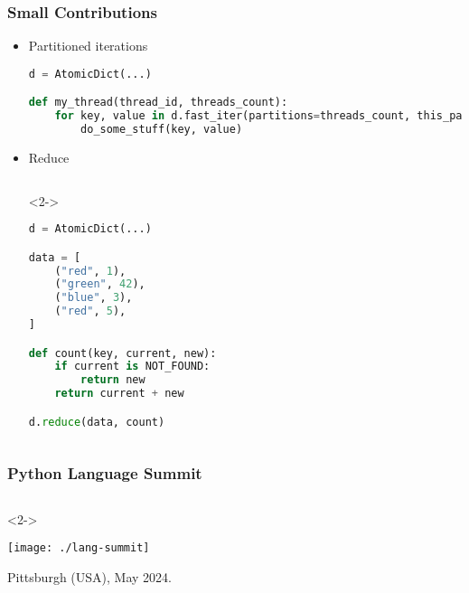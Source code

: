 \documentclass[aspectratio=169]{beamer}
\begin{document}
\begin{frame}[fragile]
    \frametitle{Small Contributions}

    \begin{itemize}
        \item Partitioned iterations
        \begin{tiny}
            \begin{lstlisting}[language=Python]
d = AtomicDict(...)

def my_thread(thread_id, threads_count):
    for key, value in d.fast_iter(partitions=threads_count, this_partition=thread_id)
        do_some_stuff(key, value)
            \end{lstlisting}
        \end{tiny}
        \item<2-> Reduce
        \begin{tiny}
            \begin{column}{\textwidth}<2->
            \begin{lstlisting}[language=Python]
d = AtomicDict(...)

data = [
    ("red", 1),
    ("green", 42),
    ("blue", 3),
    ("red", 5),
]

def count(key, current, new):
    if current is NOT_FOUND:
        return new
    return current + new

d.reduce(data, count)
            \end{lstlisting}
            \end{column}
        \end{tiny}
    \end{itemize}
\end{frame}

\begin{frame}
    \frametitle{Python Language Summit}
    \begin{columns}
        \begin{column}{\textwidth}<2->
            \begin{center}
                \texttt{[image: ./lang-summit]}

                Pittsburgh (USA), May 2024.
            \end{center}
        \end{column}
    \end{columns}
\end{frame}
\end{document}
